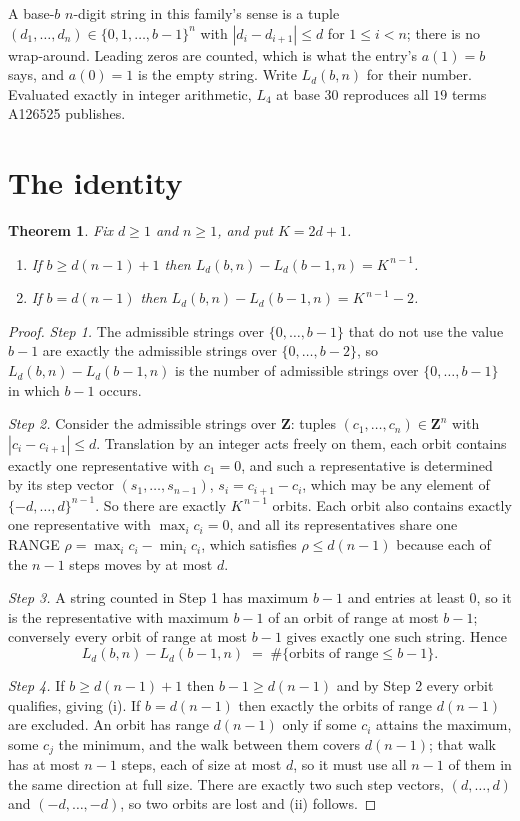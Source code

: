 \documentclass[11pt,a4paper]{article}
\theoremstyle{plain}
\newtheorem{theorem}{Theorem}
\theoremstyle{definition}
\begin{document}
A base-$b$ $n$-digit string in this family's sense is a tuple
$(d_1,\dots,d_n)\in\{0,1,\dots,b-1\}^{n}$ with $|d_i-d_{i+1}|\le d$ for $1\le i<n$; there
is no wrap-around. Leading zeros are counted, which is what the entry's $a(1)=b$ says, and
$a(0)=1$ is the empty string. Write $L_d(b,n)$ for their number. Evaluated exactly in integer
arithmetic, $L_{4}$ at base $30$ reproduces all $19$ terms A126525 publishes.

\section{The identity}

\begin{theorem}
Fix $d\ge1$ and $n\ge1$, and put $K=2d+1$.
\begin{enumerate}
\item[(i)] If $b\ge d(n-1)+1$ then $L_d(b,n)-L_d(b-1,n)=K^{\,n-1}$.
\item[(ii)] If $b=d(n-1)$ then $L_d(b,n)-L_d(b-1,n)=K^{\,n-1}-2$.
\end{enumerate}
\end{theorem}

\begin{proof}
\emph{Step 1.} The admissible strings over $\{0,\dots,b-1\}$ that do not use the value $b-1$
are exactly the admissible strings over $\{0,\dots,b-2\}$, so $L_d(b,n)-L_d(b-1,n)$ is the
number of admissible strings over $\{0,\dots,b-1\}$ in which $b-1$ occurs.

\emph{Step 2.} Consider the admissible strings over $\mathbf{Z}$: tuples
$(c_1,\dots,c_n)\in\mathbf{Z}^{n}$ with $|c_i-c_{i+1}|\le d$. Translation by an integer acts
freely on them, each orbit contains exactly one representative with $c_1=0$, and such a
representative is determined by its step vector $(s_1,\dots,s_{n-1})$, $s_i=c_{i+1}-c_i$,
which may be any element of $\{-d,\dots,d\}^{n-1}$. So there are exactly $K^{\,n-1}$ orbits.
Each orbit also contains exactly one representative with $\max_i c_i=0$, and all its
representatives share one RANGE $\rho=\max_ic_i-\min_ic_i$, which satisfies
$\rho\le d(n-1)$ because each of the $n-1$ steps moves by at most $d$.

\emph{Step 3.} A string counted in Step 1 has maximum $b-1$ and entries at least $0$, so it is
the representative with maximum $b-1$ of an orbit of range at most $b-1$; conversely every orbit
of range at most $b-1$ gives exactly one such string. Hence
\[
L_d(b,n)-L_d(b-1,n)\;=\;\#\{\text{orbits of range}\le b-1\} .
\]

\emph{Step 4.} If $b\ge d(n-1)+1$ then $b-1\ge d(n-1)$ and by Step 2 every orbit qualifies,
giving (i). If $b=d(n-1)$ then exactly the orbits of range $d(n-1)$ are excluded. An orbit has
range $d(n-1)$ only if some $c_i$ attains the maximum, some $c_j$ the minimum, and the walk
between them covers $d(n-1)$; that walk has at most $n-1$ steps, each of size at most $d$, so it
must use all $n-1$ of them in the same direction at full size. There are exactly two such step
vectors, $(d,\dots,d)$ and $(-d,\dots,-d)$, so two orbits are lost and (ii) follows.
\end{proof}
\end{document}

